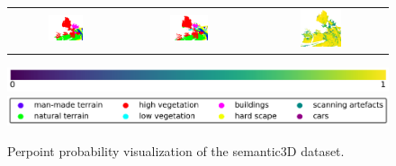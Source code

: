 \begin{figure}[h!]
\begin{tabular}{ccc}
            \includegraphics[width=0.33\textwidth, height=0.18\textheight]{images/seg_output/sem3d_seg_output/3_GT.pdf} &
            \includegraphics[width=0.33\textwidth, height=0.18\textheight]{images/seg_output/sem3d_seg_output/3_Pred.pdf}& 
            \includegraphics[width=0.33\textwidth, height=0.18\textheight]{images/seg_output/sem3d_seg_output/3_max_prob.pdf}\\
        \end{tabular}
        \includegraphics[scale=0.45]{images/prob_legend.pdf}
        \includegraphics[scale=0.45]{images/legend.png}
        \caption{Perpoint probability visualization of the semantic3D dataset.}
        \label{fig:de_sem3d_probmap}
    \end{figure}

